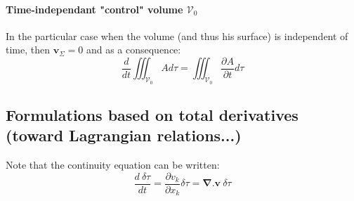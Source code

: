 \paragraph{Time-independant "control" volume $\mathcal{V}_0$}
In the particular case when the volume (and thus his surface) is independent of time, then $  \mathbf{v}_{\Sigma}=0$ and as a consequence:
\begin{equation}
 \displaystyle
 	\frac{d}{dt}\iiint_{\mathcal{V}_0} A d\tau = \iiint_{\mathcal{V}_0}\frac{\partial A}{\partial t} d\tau
\end{equation}

\subsection{Formulations based on total derivatives (toward Lagrangian relations...)}
Note that the continuity equation can be written:
\begin{equation}
	\displaystyle
	\frac{d\ \delta \tau}{dt}=\frac{\partial v_{k}}{\partial x_k} \delta\tau= \mathbf{\nabla}.\mathbf{v}\ \delta\tau
\end{equation}


